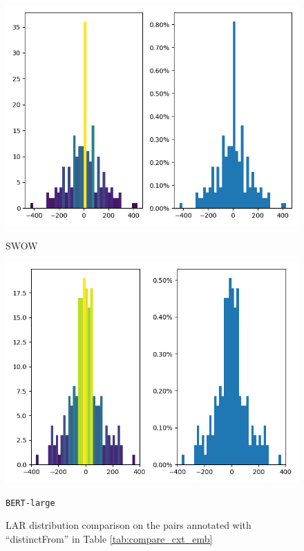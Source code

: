 \documentclass[letterpaper]{article} %
\begin{document}
\begin{figure}[!]
\centering
\begin{minipage}[b]{0.45\textwidth}
    \includegraphics[width=\textwidth]{rel_distinctfrom_gtSWOW_bert_large.png}
    \caption*{SWOW}
  \end{minipage}
  \hfill
  \begin{minipage}[b]{0.45\textwidth}
    \includegraphics[width=\textwidth]{rel_distinctfromSWOW_bert_large.png}
    \caption*{\texttt{BERT-large}}
  \end{minipage}
\caption{LAR distribution comparison on the pairs annotated with ``distinctFrom'' in Table \ref{tab:compare_cxt_emb} }
\label{fig:compare_lar_distinctFrom}
\end{figure}
\end{document}
